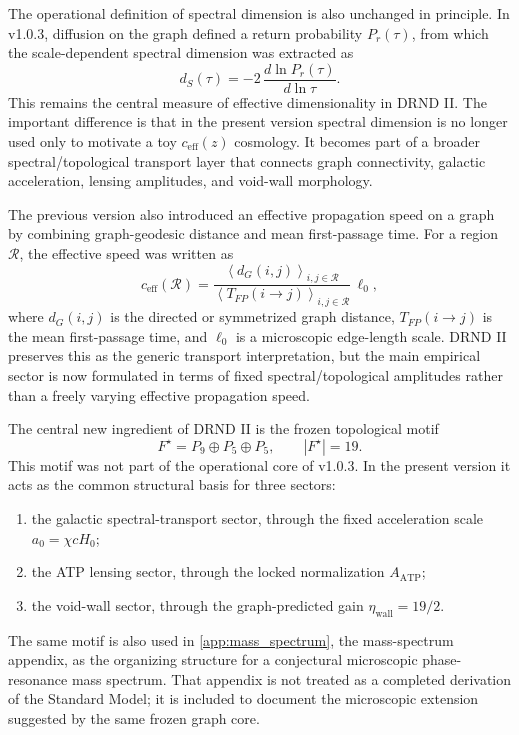 \documentclass[12pt]{iopart}
\begin{document}
The operational definition of spectral dimension is also unchanged in principle. In v1.0.3, diffusion on the graph defined a return probability \(P_r(\tau)\), from which the scale-dependent spectral dimension was extracted as
\begin{equation}
d_S(\tau)
=
-2\,\frac{d\ln P_r(\tau)}{d\ln \tau}.
\end{equation}
This remains the central measure of effective dimensionality in DRND II. The important difference is that in the present version spectral dimension is no longer used only to motivate a toy \(c_{\mathrm{eff}}(z)\) cosmology. It becomes part of a broader spectral/topological transport layer that connects graph connectivity, galactic acceleration, lensing amplitudes, and void-wall morphology.

The previous version also introduced an effective propagation speed on a graph by combining graph-geodesic distance and mean first-passage time. For a region \(\mathcal{R}\), the effective speed was written as
\begin{equation}
c_{\mathrm{eff}}(\mathcal{R})
=
\frac{
\left\langle d_G(i,j)\right\rangle_{i,j\in\mathcal{R}}
}{
\left\langle T_{FP}(i\to j)\right\rangle_{i,j\in\mathcal{R}}
}
\,\ell_0,
\end{equation}
where \(d_G(i,j)\) is the directed or symmetrized graph distance, \(T_{FP}(i\to j)\) is the mean first-passage time, and \(\ell_0\) is a microscopic edge-length scale. DRND II preserves this as the generic transport interpretation, but the main empirical sector is now formulated in terms of fixed spectral/topological amplitudes rather than a freely varying effective propagation speed.

The central new ingredient of DRND II is the frozen topological motif
\begin{equation}
F^\star=P_9\oplus P_5\oplus P_5,
\qquad |F^\star|=19.
\end{equation}
This motif was not part of the operational core of v1.0.3. In the present version it acts as the common structural basis for three sectors:
\begin{enumerate}
    \item the galactic spectral-transport sector, through the fixed acceleration scale \(a_0=\chi cH_0\);
    \item the ATP lensing sector, through the locked normalization \(A_{\mathrm{ATP}}\);
    \item the void-wall sector, through the graph-predicted gain \(\eta_{\mathrm{wall}}=19/2\).
\end{enumerate}
The same motif is also used in \ref{app:mass_spectrum}, the mass-spectrum appendix, as the organizing structure for a conjectural microscopic phase-resonance mass spectrum. That appendix is not treated as a completed derivation of the Standard Model; it is included to document the microscopic extension suggested by the same frozen graph core.
\end{document}
